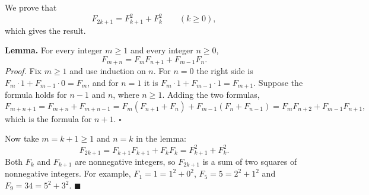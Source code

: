 We prove that
\[F_{2k+1}=F_{k+1}^2+F_k^2\qquad(k\ge0),\]
which gives the result.

\textbf{Lemma.} For every integer $m\ge1$ and every integer $n\ge0$,
\[F_{m+n}=F_mF_{n+1}+F_{m-1}F_n.\]
\emph{Proof.} Fix $m\ge1$ and use induction on $n$. For $n=0$ the right side is $F_m\cdot1+F_{m-1}\cdot0=F_m$, and for $n=1$ it is $F_m\cdot1+F_{m-1}\cdot1=F_{m+1}$. Suppose the formula holds for $n-1$ and $n$, where $n\ge1$. Adding the two formulas,
\[F_{m+n+1}=F_{m+n}+F_{m+n-1}=F_m\left(F_{n+1}+F_n\right)+F_{m-1}\left(F_n+F_{n-1}\right)=F_mF_{n+2}+F_{m-1}F_{n+1},\]
which is the formula for $n+1$. $\square$

Now take $m=k+1\ge1$ and $n=k$ in the lemma:
\[F_{2k+1}=F_{k+1}F_{k+1}+F_kF_k=F_{k+1}^2+F_k^2.\]
Both $F_k$ and $F_{k+1}$ are nonnegative integers, so $F_{2k+1}$ is a sum of two squares of nonnegative integers. For example, $F_1=1=1^2+0^2$, $F_5=5=2^2+1^2$ and $F_9=34=5^2+3^2$. $\blacksquare$
